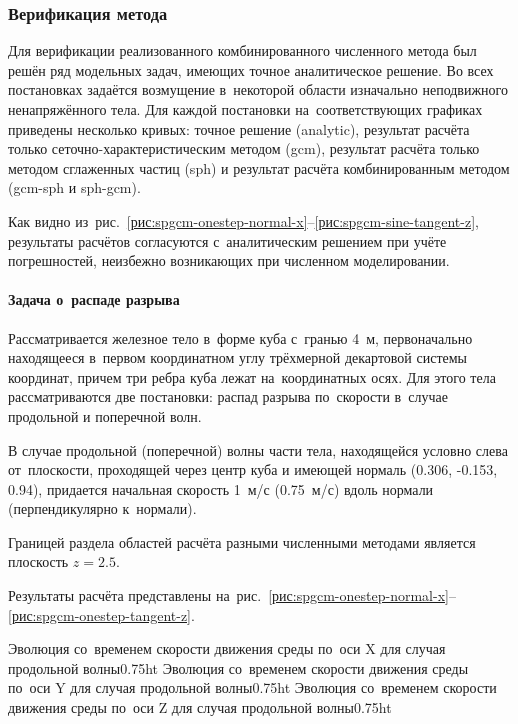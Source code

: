 \documentclass[thesis.tex]{subfiles}
\begin{document}
\subsubsection{Верификация метода}
\label{раздел:верификация-комбинированного-метода}

Для верификации реализованного комбинированного численного метода был решён ряд модельных задач, имеющих
точное аналитическое решение.  Во всех постановках задаётся возмущение в~некоторой области изначально неподвижного
ненапряжённого тела. Для каждой постановки на~соответствующих графиках приведены несколько кривых: точное решение
(analytic), результат расчёта только сеточно-характеристическим методом (gcm), результат расчёта только методом
сглаженных частиц (sph) и результат расчёта комбинированным методом (gcm-sph и sph-gcm).

Как видно из~рис.~\ref{рис:spgcm-onestep-normal-x}--\ref{рис:spgcm-sine-tangent-z}, результаты расчётов
согласуются с~аналитическим решением при учёте погрешностей, неизбежно возникающих при численном моделировании.

\paragraph{Задача о~распаде разрыва}

Рассматривается железное тело в~форме куба с~гранью 4~м, первоначально находящееся в~первом координатном углу трёхмерной
декартовой системы координат, причем три ребра куба лежат на~координатных осях. Для этого тела рассматриваются две
постановки: распад разрыва по~скорости в~случае продольной и поперечной волн.

В случае продольной (поперечной) волны части тела, находящейся условно слева от~плоскости, проходящей через центр куба и имеющей
нормаль (0.306, -0.153, 0.94), придается начальная скорость 1~м/с (0.75~м/с) вдоль нормали (перпендикулярно к~нормали).

Границей раздела областей расчёта разными численными методами является плоскость $z=2.5$.

Результаты расчёта представлены на~рис.~\ref {рис:spgcm-onestep-normal-x}--\ref {рис:spgcm-onestep-tangent-z}.

          {Эволюция со~временем скорости движения среды по~оси X для случая продольной волны}{0.75\linewidth}{ht}
          {Эволюция со~временем скорости движения среды по~оси Y для случая продольной волны}{0.75\linewidth}{ht}
          {Эволюция со~временем скорости движения среды по~оси Z для случая продольной волны}{0.75\linewidth}{ht}
\end{document}
